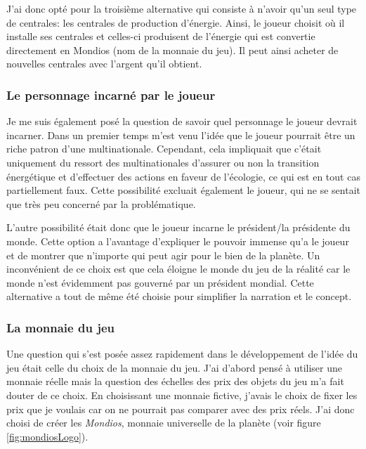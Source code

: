 \documentclass{article}
\begin{document}
        
        J'ai donc opté pour la troisième alternative qui consiste à n'avoir qu'un seul type de centrales: les centrales de production d'énergie. Ainsi, le joueur choisit où il installe ses centrales et celles-ci produisent de l'énergie qui est convertie directement en Mondios (nom de la monnaie du jeu). Il peut ainsi acheter de nouvelles centrales avec l'argent qu'il obtient.
        
        \subsubsection{Le personnage incarné par le joueur}
        Je me suis également posé la question de savoir quel personnage le joueur devrait incarner. Dans un premier temps m'est venu l'idée que le joueur pourrait être un riche patron d'une multinationale. Cependant, cela impliquait que c'était uniquement du ressort des multinationales d'assurer ou non la transition énergétique et d'effectuer des actions en faveur de l'écologie, ce qui est en tout cas partiellement faux. Cette possibilité excluait également le joueur, qui ne se sentait que très peu concerné par la problématique.
        
        
        L'autre possibilité était donc que le joueur incarne le président/la présidente du monde. Cette option a l'avantage d'expliquer le pouvoir immense qu'a le joueur et de montrer que n'importe qui peut agir pour le bien de la planète.
        Un inconvénient de ce choix est que cela éloigne le monde du jeu de la réalité car le monde n'est évidemment pas gouverné par un président mondial. Cette alternative a tout de même été choisie pour simplifier la narration et le concept.
        

		\subsubsection{La monnaie du jeu}
		Une question qui s'est posée assez rapidement dans le développement de l'idée du jeu était celle du choix de la monnaie du jeu. J'ai d'abord pensé à utiliser une monnaie réelle mais la question des échelles des prix des objets du jeu m'a fait douter de ce choix. En choisissant une monnaie fictive, j'avais le choix de fixer les prix que je voulais car on ne pourrait pas comparer avec des prix réels.
		J'ai donc choisi de créer les \textit{Mondios}, monnaie universelle de la planète (voir figure \ref{fig:mondiosLogo}).
		
\end{document}
